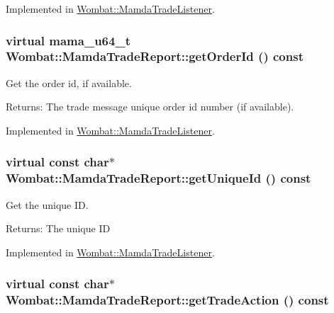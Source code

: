 Implemented in \hyperlink{classWombat_1_1MamdaTradeListener_1a5b54d3d63c62bf8720cc29dd40b25a}{Wombat::Mamda\-Trade\-Listener}.\hypertarget{classWombat_1_1MamdaTradeReport_d4b975d041261a0dcca2e2413c25e72e}{
\subsubsection[getOrderId]{\setlength{\rightskip}{0pt plus 5cm}virtual mama\_\-u64\_\-t Wombat::Mamda\-Trade\-Report::get\-Order\-Id () const}}
\label{classWombat_1_1MamdaTradeReport_d4b975d041261a0dcca2e2413c25e72e}


Get the order id, if available. 

\begin{Desc}
\item[Returns:]The trade message unique order id number (if available). \end{Desc}


Implemented in \hyperlink{classWombat_1_1MamdaTradeListener_46c9913f3bc9f7e31f07afa76eaed7ff}{Wombat::Mamda\-Trade\-Listener}.\hypertarget{classWombat_1_1MamdaTradeReport_76e8e93ea2a7f53fb2b0287572dbf7ec}{
\subsubsection[getUniqueId]{\setlength{\rightskip}{0pt plus 5cm}virtual const char$\ast$ Wombat::Mamda\-Trade\-Report::get\-Unique\-Id () const}}
\label{classWombat_1_1MamdaTradeReport_76e8e93ea2a7f53fb2b0287572dbf7ec}


Get the unique ID. 

\begin{Desc}
\item[Returns:]The unique ID \end{Desc}


Implemented in \hyperlink{classWombat_1_1MamdaTradeListener_997416236d779434a70ff52427ac9b8f}{Wombat::Mamda\-Trade\-Listener}.\hypertarget{classWombat_1_1MamdaTradeReport_488ca9ba3b64fd6c0996e0df649c5834}{
\subsubsection[getTradeAction]{\setlength{\rightskip}{0pt plus 5cm}virtual const char$\ast$ Wombat::Mamda\-Trade\-Report::get\-Trade\-Action () const}}
\label{classWombat_1_1MamdaTradeReport_488ca9ba3b64fd6c0996e0df649c5834}


